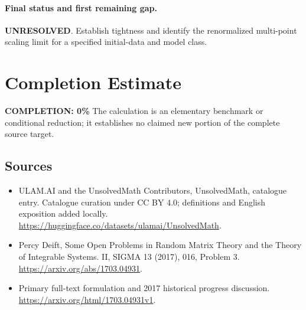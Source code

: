 \documentclass[11pt]{article}
\begin{document}
\paragraph{Final status and first remaining gap.}
\textbf{UNRESOLVED}. Establish tightness and identify the renormalized multi-point scaling limit for a specified initial-data and model class.

\section{Completion Estimate}
\noindent\textbf{COMPLETION: 0\%}
The calculation is an elementary benchmark or conditional reduction; it establishes no claimed new portion of the complete source target.

\subsection{Sources}
\begin{itemize}
\item[\hypertarget{source:statement:1}{S1}] ULAM.AI and the UnsolvedMath Contributors, UnsolvedMath, catalogue entry. Catalogue curation under CC BY 4.0; definitions and English exposition added locally.
\url{https://huggingface.co/datasets/ulamai/UnsolvedMath}.
\item[\hypertarget{source:statement:2}{S2}] Percy Deift, Some Open Problems in Random Matrix Theory and the Theory of Integrable Systems. II, SIGMA 13 (2017), 016, Problem 3.
\url{https://arxiv.org/abs/1703.04931}.
\item[\hypertarget{source:statement:3}{S3}] Primary full-text formulation and 2017 historical progress discussion.
\url{https://arxiv.org/html/1703.04931v1}.
\end{itemize}
\label{end:statement}
\end{document}
